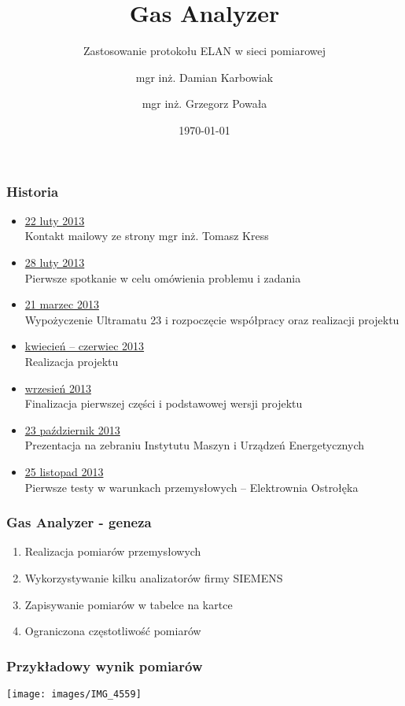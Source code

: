 \documentclass[ucs]{beamer}
\title{Gas Analyzer}
\subtitle{Zastosowanie protokołu ELAN w sieci pomiarowej}
\author[Karbowiak, Powała]{mgr inż. Damian Karbowiak  \and mgr inż. Grzegorz Powała}
\institute[Politechnika Śląska]{\texttt{[image: images/PolslLogo]} }
\date{\today}
\begin{document}
\begin{frame}
  \titlepage
\end{frame}

\begin{frame}
\frametitle{Historia}
\vspace{-2mm}
\begin{itemize}
\setlength{\itemsep}{0pt}
\setlength{\parskip}{0pt}
\setlength{\parsep}{0pt}
\item \underline{22 luty 2013} \\
Kontakt mailowy ze strony mgr inż. Tomasz Kress
\item \underline{28 luty 2013} \\
Pierwsze spotkanie w celu omówienia problemu i zadania
\item \underline{21 marzec 2013} \\
Wypożyczenie Ultramatu 23 i rozpoczęcie współpracy oraz realizacji projektu
\item \underline{kwiecień -- czerwiec 2013} \\
Realizacja projektu
\item \underline{wrzesień 2013} \\
Finalizacja pierwszej części i podstawowej wersji projektu
\item \underline{23 październik 2013} \\
Prezentacja na zebraniu Instytutu Maszyn i Urządzeń Energetycznych
\item \underline{25 listopad 2013} \\
Pierwsze testy w warunkach przemysłowych -- Elektrownia Ostrołęka
\end{itemize}
\end{frame}

\begin{frame}
\frametitle{Gas Analyzer - geneza}
\begin{enumerate}
\setlength{\itemsep}{5pt}
\setlength{\parskip}{5pt}
\setlength{\parsep}{5pt}
\item Realizacja pomiarów przemysłowych
\item Wykorzystywanie kilku analizatorów firmy SIEMENS
\item Zapisywanie pomiarów w tabelce na kartce
\item Ograniczona częstotliwość pomiarów
\end{enumerate}
\end{frame}

\begin{frame}
\frametitle{Przykładowy wynik pomiarów}
\begin{center}
\texttt{[image: images/IMG\_4559]}
\end{center}
\end{frame}
\end{document}
